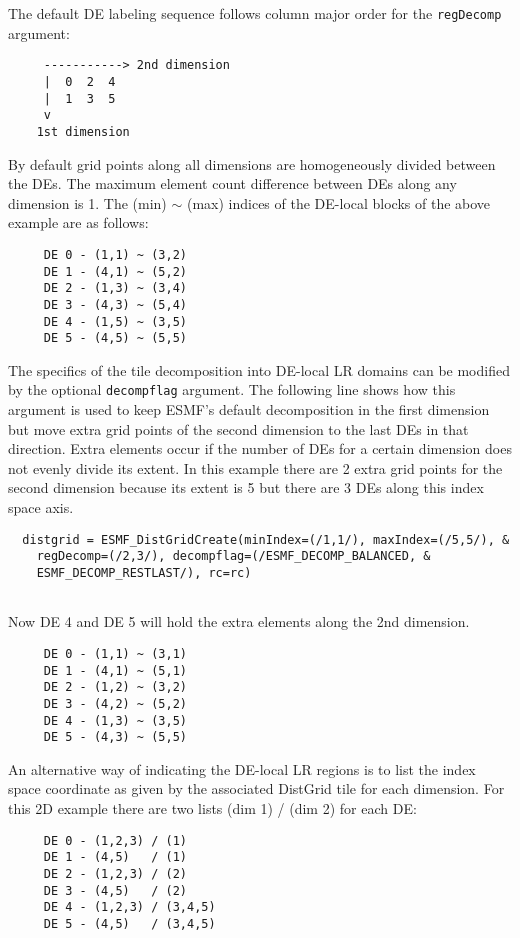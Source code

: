 
   The default DE labeling sequence follows column major order for the
   {\tt regDecomp} argument:
   \begin{verbatim}
     -----------> 2nd dimension
     |  0  2  4
     |  1  3  5
     v
    1st dimension
   \end{verbatim}
  
   By default grid points along all dimensions are homogeneously divided between
   the DEs. The maximum element count difference between DEs along any dimension
   is 1. The (min) $\sim$ (max) indices of the DE-local blocks of the above
   example are as follows:
   \begin{verbatim}
     DE 0 - (1,1) ~ (3,2)
     DE 1 - (4,1) ~ (5,2)
     DE 2 - (1,3) ~ (3,4)
     DE 3 - (4,3) ~ (5,4)
     DE 4 - (1,5) ~ (3,5)
     DE 5 - (4,5) ~ (5,5)
   \end{verbatim}
   
   The specifics of the tile decomposition into DE-local LR domains can be
   modified by the optional {\tt decompflag} argument. The following line shows
   how this argument is used to keep ESMF's default decomposition in the first
   dimension but move extra grid points of the second dimension to the last DEs
   in that direction. Extra elements occur if the number of DEs for a certain
   dimension does not evenly divide its extent. In this example there are
   2 extra grid points for the second dimension because its extent is 5 but there
   are 3 DEs along this index space axis. 

 \begin{verbatim}
  distgrid = ESMF_DistGridCreate(minIndex=(/1,1/), maxIndex=(/5,5/), &
    regDecomp=(/2,3/), decompflag=(/ESMF_DECOMP_BALANCED, &
    ESMF_DECOMP_RESTLAST/), rc=rc)
 
\end{verbatim}
 

   Now DE 4 and DE 5 will hold the extra elements along the 2nd dimension.
   \begin{verbatim}
     DE 0 - (1,1) ~ (3,1)
     DE 1 - (4,1) ~ (5,1)
     DE 2 - (1,2) ~ (3,2)
     DE 3 - (4,2) ~ (5,2)
     DE 4 - (1,3) ~ (3,5)
     DE 5 - (4,3) ~ (5,5)
   \end{verbatim}
  
   An alternative way of indicating the DE-local LR regions is to list the 
   index space coordinate as given by the associated DistGrid tile for each
   dimension. For this 2D example there are two lists (dim 1) / (dim 2) for each
   DE:
   \begin{verbatim}
     DE 0 - (1,2,3) / (1)
     DE 1 - (4,5)   / (1)
     DE 2 - (1,2,3) / (2)
     DE 3 - (4,5)   / (2)
     DE 4 - (1,2,3) / (3,4,5)
     DE 5 - (4,5)   / (3,4,5)
   \end{verbatim}
  
